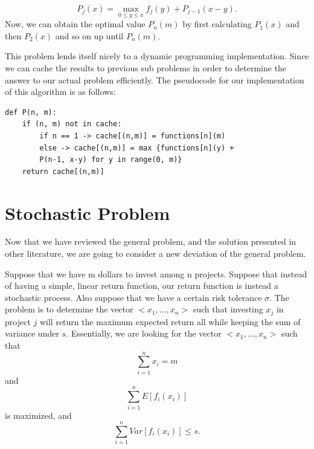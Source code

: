 \documentclass{article}
\begin{document}
\newline
$$P_{j}(x) = \max_{0\leq y\leq x} f_{j}(y) + P_{j-1}(x-y).$$
\newline
Now, we can obtain the optimal value $P_{n}(m)$ by first calculating $P_{1}(x)$ and then $P_{2}(x)$ and so on up until $P_{n}(m).$ 
\newline
\par
This problem lends itself nicely to a dynamic programming implementation. Since we can cache the results to previous sub problems in order to determine the answer to our actual problem efficiently.  The pseudocode for our implementation of this algorithm is as follows:
\newline
\begin{lstlisting}
def P(n, m):
    if (n, m) not in cache:
        if n == 1 -> cache[(n,m)] = functions[n](m)
        else -> cache[(n,m)] = max {functions[n](y) + 
        P(n-1, x-y) for y in range(0, m)}
    return cache[(n,m)]

\end{lstlisting}
\newline
\par


\section{Stochastic Problem}
\par
Now that we have reviewed the general problem, and the solution presented in other literature, we are going to consider a new deviation of the general problem.  
\par
Suppose that we have m dollars to invest among n projects. Suppose that instead of having a simple, linear return function, our return function is instead a stochastic process. Also suppose that we have a certain risk tolerance $\sigma$. The problem is to determine the vector $<x_{1},...,x_{n}>$ such that investing $x_{j}$ in project $j$ will return the maximum expected return all while keeping the sum of variance under $s$. Essentially, we are looking for the vector $<x_{1},...,x_{n}>$ such that 
$$\sum_{i=1}^{n}x_{i} = m$$
and
$$\sum_{i=1}^{n} E[f_{i}(x_{i})]$$
is maximized, and
$$\sum_{i=1}^{n} Var[f_{i}(x_{i})] \leq s.$$
\end{document}
